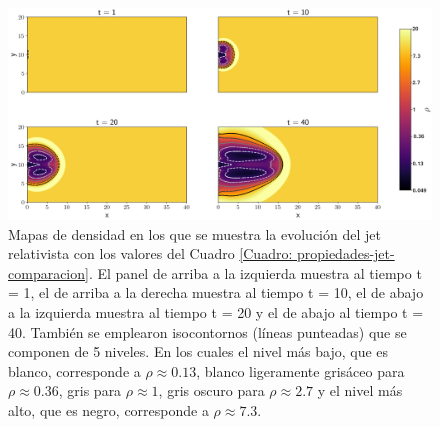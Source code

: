 \documentclass[12pt,a4paper]{book}
\begin{document}
\begin{figure}
  \centering
  \includegraphics[width=1\textwidth]{./Figuras/capitulo_4/evolucion/evolucion.png}
    \caption{Mapas de densidad en los que se muestra la evolución del jet relativista 
    con los valores del Cuadro 
    \ref{Cuadro: propiedades-jet-comparacion}. El panel de arriba a la izquierda muestra al 
    tiempo t = 1, el de arriba a la derecha muestra al tiempo t = 10, 
    el de abajo a la izquierda muestra al tiempo t = 20 y el de abajo al tiempo t = 40.
    También se emplearon isocontornos (líneas punteadas) que se componen de 5 niveles. En los 
    cuales el nivel más bajo, que es blanco, corresponde a $\rho \approx 0.13$, blanco ligeramente grisáceo 
    para $\rho \approx 0.36$,
    gris para $\rho \approx 1$, gris oscuro para $\rho  \approx 2.7$ y el nivel más alto, que es negro, 
    corresponde a $\rho \approx 7.3$.}
    \label{fig:evolucion_temporal_del_jet}
\end{figure}
\end{document}
